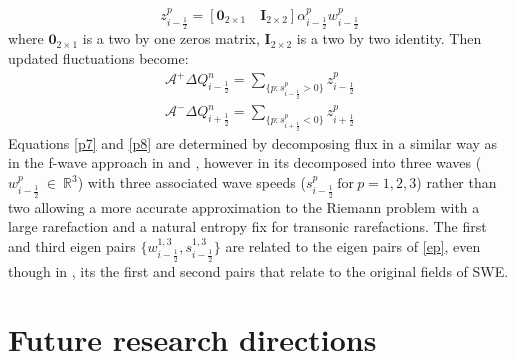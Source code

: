 \documentclass[11pt,a4paper]{article}
\begin{document}
	\begin{equation}
		z_{i-\frac{1}{2}}^{p} = [\mathbf{0}_{2\times1} \quad \mathbf{I}_{2\times2}] \alpha_{i-\frac{1}{2}}^{p} w_{i-\frac{1}{2}}^{p}
	\end{equation}
	where $\mathbf{0}_{2\times1}$ is a two by one zeros matrix, $\mathbf{I}_{2\times2}$ is a two by two identity. Then updated fluctuations become:
	\begin{eqnarray}
		\mathcal{A^{+}}\Delta Q_{i-\frac{1}{2}}^{n} = \sum_{\{ p:s_{i-\frac{1}{2}}^{p}>0\}}  z_{i-\frac{1}{2}}^{p}
		\label{p7}\\
		\mathcal{A^{-}}\Delta Q_{i+\frac{1}{2}}^{n} = \sum_{\{ p:s_{i+\frac{1}{2}}^{p}<0\}} z_{i+\frac{1}{2}}^{p}
		\label{p8}
	\end{eqnarray}
	Equations \ref{p7} and \ref{p8} are determined by decomposing flux in a similar way as in the f-wave approach in \citet{ba-le-mi-ro:2003} and \citet{george2006finite}, however in  \citet{ge:2008}  its decomposed into three waves ($w^{p}_{i-\frac{1}{2}} ~\in ~\mathbb{R}^{3}$)  with three associated wave speeds ($s^{p}_{i-\frac{1}{2}} ~\text{for}~ p =1,2,3$)  rather than two  allowing a more accurate approximation to the Riemann problem with a large rarefaction and a natural entropy fix for transonic rarefactions. The first and third eigen pairs $\{w^{1,3}_{i-\frac{1}{2}},s^{1,3}_{i-\frac{1}{2}}\}  $    are related to the eigen pairs of \eqref{ep}, even though in  \citet{be-ge-le-ma:2011}, its the first and second pairs that relate to the original fields of SWE. \\
	

	\section{ Future research directions}
	
	
	
	
	
	
	
	
\end{document}
